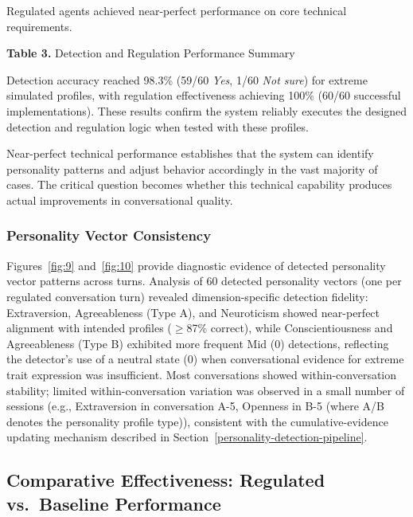 Regulated agents achieved near-perfect performance on core technical requirements.

\textbf{Table 3.} Detection and Regulation Performance Summary

Detection accuracy reached 98.3\% (59/60 \emph{Yes}, 1/60 \emph{Not sure}) for extreme simulated profiles, with regulation effectiveness achieving 100\% (60/60 successful implementations). These results confirm the system reliably executes the designed detection and regulation logic when tested with these profiles.

Near-perfect technical performance establishes that the system can identify personality patterns and adjust behavior accordingly in the vast majority of cases. The critical question becomes whether this technical capability produces actual improvements in conversational quality.

\subsubsection{Personality Vector Consistency}\label{personality-vector-consistency}

Figures~\ref{fig:9} and~\ref{fig:10} provide diagnostic evidence of detected personality vector patterns across turns. Analysis of 60 detected personality vectors (one per regulated conversation turn) revealed dimension-specific detection fidelity: Extraversion, Agreeableness (Type A), and Neuroticism showed near-perfect alignment with intended profiles ($\geq$87\% correct), while Conscientiousness and Agreeableness (Type B) exhibited more frequent Mid (0) detections, reflecting the detector's use of a neutral state ($0$) when conversational evidence for extreme trait expression was insufficient. Most conversations showed within-conversation stability; limited within-conversation variation was observed in a small number of sessions (e.g., Extraversion in conversation A-5, Openness in B-5 (where A/B denotes the personality profile type)), consistent with the cumulative-evidence updating mechanism described in Section~\ref{personality-detection-pipeline}.





\subsection{Comparative Effectiveness: Regulated vs.~Baseline Performance}\label{comparative-effectiveness-regulated-vs-baseline-performance}

